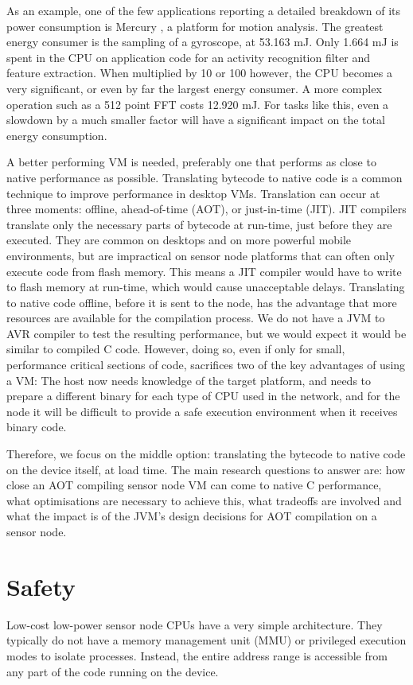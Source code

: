 As an example, one of the few applications reporting a detailed breakdown of its power consumption is Mercury \cite{Lorincz:2009kt}, a platform for motion analysis. The greatest energy consumer is the sampling of a gyroscope, at 53.163 mJ. Only 1.664 mJ is spent in the CPU on application code for an activity recognition filter and feature extraction. When multiplied by 10 or 100 however, the CPU becomes a very significant, or even by far the largest energy consumer. A more complex operation such as a 512 point FFT costs 12.920 mJ. For tasks like this, even a slowdown by a much smaller factor will have a significant impact on the total energy consumption.

A better performing VM is needed, preferably one that performs as close to native performance as possible. Translating bytecode to native code is a common technique to improve performance in desktop VMs. Translation can occur at three moments: offline, ahead-of-time (AOT), or just-in-time (JIT). JIT compilers translate only the necessary parts of bytecode at run-time, just before they are executed. They are common on desktops and on more powerful mobile environments, but are impractical on sensor node platforms that can often only execute code from flash memory. This means a JIT compiler would have to write to flash memory at run-time, which would cause unacceptable delays. Translating to native code offline, before it is sent to the node, has the advantage that more resources are available for the compilation process. We do not have a JVM to AVR compiler to test the resulting performance, but we would expect it would be similar to compiled C code. However, doing so, even if only for small, performance critical sections of code, sacrifices two of the key advantages of using a VM: The host now needs knowledge of the target platform, and needs to prepare a different binary for each type of CPU used in the network, and for the node it will be difficult to provide a safe execution environment when it receives binary code.

Therefore, we focus on the middle option: translating the bytecode to native code on the device itself, at load time. The main research questions to answer are: how close an AOT compiling sensor node VM can come to native C performance, what optimisations are necessary to achieve this, what tradeoffs are involved and what the impact is of the JVM's design decisions for AOT compilation on a sensor node.

\section{Safety}
Low-cost low-power sensor node CPUs have a very simple architecture. They typically do not have a memory management unit (MMU) or privileged execution modes to isolate processes. Instead, the entire address range is accessible from any part of the code running on the device.

